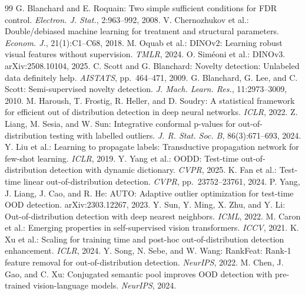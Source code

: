 \begin{thebibliography}{99}
 G. Blanchard and E. Roquain: Two simple sufficient conditions for FDR control. \textit{Electron. J. Stat.}, 2:963--992, 2008.
 V. Chernozhukov et al.: Double/debiased machine learning for treatment and structural parameters. \textit{Econom. J.}, 21(1):C1--C68, 2018.
 M. Oquab et al.: DINOv2: Learning robust visual features without supervision. \textit{TMLR}, 2024.
 O. Sim\'{e}oni et al.: DINOv3. arXiv:2508.10104, 2025.
 C. Scott and G. Blanchard: Novelty detection: Unlabeled data definitely help. \textit{AISTATS}, pp.~464--471, 2009.
 G. Blanchard, G. Lee, and C. Scott: Semi-supervised novelty detection. \textit{J. Mach. Learn. Res.}, 11:2973--3009, 2010.
 M. Haroush, T. Frostig, R. Heller, and D. Soudry: A statistical framework for efficient out of distribution detection in deep neural networks. \textit{ICLR}, 2022.
 Z. Liang, M. Sesia, and W. Sun: Integrative conformal p-values for out-of-distribution testing with labelled outliers. \textit{J. R. Stat. Soc. B}, 86(3):671--693, 2024.
 Y. Liu et al.: Learning to propagate labels: Transductive propagation network for few-shot learning. \textit{ICLR}, 2019.
 Y. Yang et al.: OODD: Test-time out-of-distribution detection with dynamic dictionary. \textit{CVPR}, 2025.
 K. Fan et al.: Test-time linear out-of-distribution detection. \textit{CVPR}, pp.~23752--23761, 2024.
 P. Yang, J. Liang, J. Cao, and R. He: AUTO: Adaptive outlier optimization for test-time OOD detection. arXiv:2303.12267, 2023.
 Y. Sun, Y. Ming, X. Zhu, and Y. Li: Out-of-distribution detection with deep nearest neighbors. \textit{ICML}, 2022.
 M. Caron et al.: Emerging properties in self-supervised vision transformers. \textit{ICCV}, 2021.
 K. Xu et al.: Scaling for training time and post-hoc out-of-distribution detection enhancement. \textit{ICLR}, 2024.
 Y. Song, N. Sebe, and W. Wang: RankFeat: Rank-1 feature removal for out-of-distribution detection. \textit{NeurIPS}, 2022.
 M. Chen, J. Gao, and C. Xu: Conjugated semantic pool improves OOD detection with pre-trained vision-language models. \textit{NeurIPS}, 2024.
\end{thebibliography}
